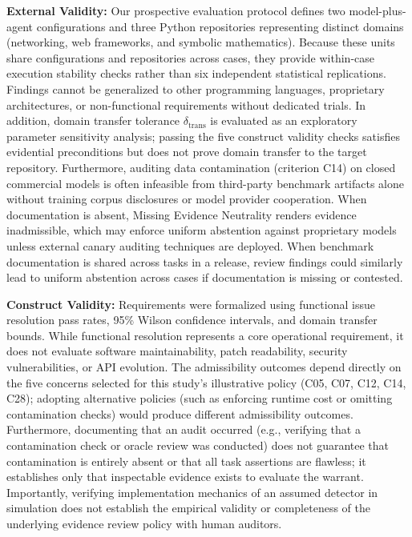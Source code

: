 \documentclass[runningheads]{llncs}
\begin{document}
\textbf{External Validity:} Our prospective evaluation protocol defines two model-plus-agent configurations and three Python repositories representing distinct domains (networking, web frameworks, and symbolic mathematics). Because these units share configurations and repositories across cases, they provide within-case execution stability checks rather than six independent statistical replications. Findings cannot be generalized to other programming languages, proprietary architectures, or non-functional requirements without dedicated trials. In addition, domain transfer tolerance $\delta_{\text{trans}}$ is evaluated as an exploratory parameter sensitivity analysis; passing the five construct validity checks satisfies evidential preconditions but does not prove domain transfer to the target repository. Furthermore, auditing data contamination (criterion C14) on closed commercial models is often infeasible from third-party benchmark artifacts alone without training corpus disclosures or model provider cooperation. When documentation is absent, Missing Evidence Neutrality renders evidence inadmissible, which may enforce uniform abstention against proprietary models unless external canary auditing techniques are deployed. When benchmark documentation is shared across tasks in a release, review findings could similarly lead to uniform abstention across cases if documentation is missing or contested.

\textbf{Construct Validity:} Requirements were formalized using functional issue resolution pass rates, 95\% Wilson confidence intervals, and domain transfer bounds. While functional resolution represents a core operational requirement, it does not evaluate software maintainability, patch readability, security vulnerabilities, or API evolution. The admissibility outcomes depend directly on the five concerns selected for this study's illustrative policy (C05, C07, C12, C14, C28); adopting alternative policies (such as enforcing runtime cost or omitting contamination checks) would produce different admissibility outcomes. Furthermore, documenting that an audit occurred (e.g., verifying that a contamination check or oracle review was conducted) does not guarantee that contamination is entirely absent or that all task assertions are flawless; it establishes only that inspectable evidence exists to evaluate the warrant. Importantly, verifying implementation mechanics of an assumed detector in simulation does not establish the empirical validity or completeness of the underlying evidence review policy with human auditors.
\end{document}
